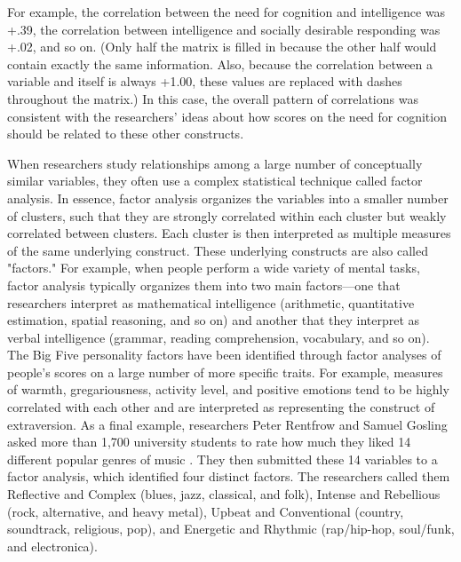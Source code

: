 For example, the correlation between the need for cognition and intelligence was +.39, the correlation between intelligence and socially desirable responding was +.02, and so on. (Only half the matrix is filled in because the other half would contain exactly the same information. Also, because the correlation between a variable and itself is always +1.00, these values are replaced with dashes throughout the matrix.) In this case, the overall pattern of correlations was consistent with the researchers' ideas about how scores on the need for cognition should be related to these other constructs.

When researchers study relationships among a large number of conceptually similar variables, they often use a complex statistical technique called factor analysis. In essence, factor analysis organizes the variables into a smaller number of clusters, such that they are strongly correlated within each cluster but weakly correlated between clusters. Each cluster is then interpreted as multiple measures of the same underlying construct. These underlying constructs are also called "factors." For example, when people perform a wide variety of mental tasks, factor analysis typically organizes them into two main factors---one that researchers interpret as mathematical intelligence (arithmetic, quantitative estimation, spatial reasoning, and so on) and another that they interpret as verbal intelligence (grammar, reading comprehension, vocabulary, and so on). The Big Five personality factors have been identified through factor analyses of people's scores on a large number of more specific traits. For example, measures of warmth, gregariousness, activity level, and positive emotions tend to be highly correlated with each other and are interpreted as representing the construct of extraversion. As a final example, researchers Peter Rentfrow and Samuel Gosling asked more than 1,700 university students to rate how much they liked 14 different popular genres of music \citep{rentfrow_re_2003}. They then submitted these 14 variables to a factor analysis, which identified four distinct factors. The researchers called them Reflective and Complex (blues, jazz, classical, and folk), Intense and Rebellious (rock, alternative, and heavy metal), Upbeat and Conventional (country, soundtrack, religious, pop), and Energetic and Rhythmic (rap/hip-hop, soul/funk, and electronica).

